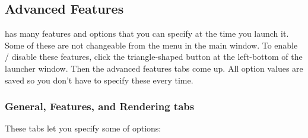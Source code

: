 \subsection{Advanced Features}
\FlightGear{} has many features and options that you can specify at the time you launch it. Some of these are not changeable from the menu in the \FlightGear{} main window. To enable / disable these features, click the triangle-shaped button at the left-bottom of the launcher window. Then the advanced features tabs come up. All option values are saved so you don't have to specify these every time.

\subsubsection{General, Features, and Rendering tabs}
These tabs let you specify some of \FlightGear{} options:
